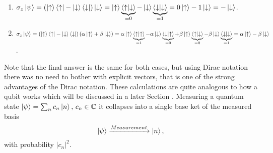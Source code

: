 \begin{enumerate}[label=\textbf{\alph*)}]
\item  $\sigma_z \ket{\psi} = (\ket{\uparrow}\bra{\uparrow} - \ket{\downarrow}\bra{\downarrow})\ket{\downarrow} = \ket{\uparrow}\underbrace{\bra{\uparrow}\ket{\downarrow}}_{ = 0} - \ket{\downarrow}\underbrace{\bra{\downarrow}\ket{\downarrow}}_{ = 1} = 0\ket{\uparrow} - 1\ket{\downarrow} = -\ket{\downarrow}$.
\item $\sigma_z \ket{\psi} = \left( \ket{\uparrow}\bra{\uparrow} - \ket{\downarrow}\bra{\downarrow} \right) \left(\alpha\ket{\uparrow} + \beta\ket{\downarrow} \right) = 
\alpha\ket{\uparrow}\underbrace{\bra{\uparrow}\ket{\uparrow}}_{ = 1} - \alpha\ket{\downarrow}\underbrace{\bra{\downarrow}\ket{\uparrow}}_{ = 0}
+
\beta\ket{\uparrow}\underbrace{\bra{\uparrow}\ket{\downarrow}}_{ = 0} - \beta\ket{\downarrow}\underbrace{\bra{\downarrow}\ket{\downarrow}}_{ = 1} = \alpha\ket{\uparrow} - \beta\ket{\downarrow}$.
\end{enumerate}
Note that the final answer is the same for both cases, but using Dirac notation there was no need to bother with explicit vectors, that is one of the strong advantages of the Dirac notation. These calculations are quite analogous to how a qubit works which will be discussed in a later Section . Measuring a quantum state $\ket{\psi} = \sum_{n}c_n\ket{n},\, c_n\in \mathbb{C}$ it collapses into a single base ket of the measured basis
\begin{equation}
\ket{\psi} \xrightarrow{Measurement} \ket{n},
\end{equation}
with probability $|c_n|^2$. 




